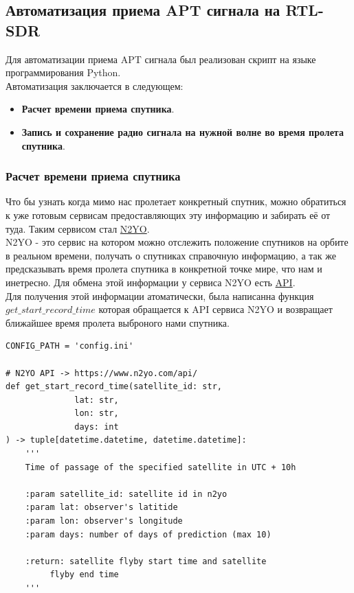 \documentclass[a4paper, 14pt, titlepage, fleqn]{extarticle}
\begin{document}
	\subsection*{Автоматизация приема APT сигнала на RTL-SDR}
	
	Для автоматизации приема APT сигнала был реализован скрипт на языке программирования Python. \\
	
	\noindent Автоматизация заключается в следующем:
	
	\begin{itemize}
		\item \textbf{Расчет времени приема спутника}.
		\item \textbf{Запись и сохранение радио сигнала на нужной волне во время пролета спутника}.
	\end{itemize}
	
	\subsubsection*{Расчет времени приема спутника}
	
	Что бы узнать когда мимо нас пролетает конкретный спутник, можно обратиться к уже готовым сервисам предоставляющих эту информацию и забирать её от туда. Таким сервисом стал \href{https://www.n2yo.com/?s=33591}{N2YO}. \\
	
	 N2YO - это сервис на котором можно отслежить положение спутников на орбите в реальном времени, получать о спутниках справочную информацию, а так же предсказывать время пролета спутника в конкретной точке мире, что нам и инетресно. Для обмена этой информации у сервиса N2YO есть \href{https://www.n2yo.com/api/}{API}. \\
	
	 Для получения этой информации атоматически, была написанна функция $get\_start\_record\_time$ которая обращается к API сервиса N2YO и возвращает ближайшее время пролета выброного нами спутника.
	
	\begin{verbatim}
CONFIG_PATH = 'config.ini'

# N2YO API -> https://www.n2yo.com/api/
def get_start_record_time(satellite_id: str, 
			  lat: str, 
			  lon: str, 
			  days: int
) -> tuple[datetime.datetime, datetime.datetime]:
    '''
    Time of passage of the specified satellite in UTC + 10h

    :param satellite_id: satellite id in n2yo
    :param lat: observer's latitide
    :param lon: observer's longitude
    :param days: number of days of prediction (max 10)
    
    :return: satellite flyby start time and satellite
    	 flyby end time
    '''
	\end{verbatim}
	
\end{document}
